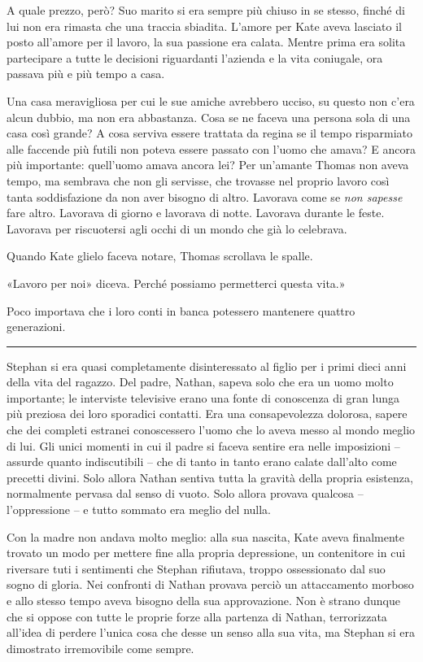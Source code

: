 \documentclass[a4paper,oneside,11pt]{memoir}
\begin{document}
A quale prezzo, però? Suo marito si era sempre più chiuso in se stesso, finché
di lui non era rimasta che una traccia sbiadita. L'amore per Kate aveva lasciato
il posto all'amore per il lavoro, la sua passione era calata. Mentre prima era
solita partecipare a tutte le decisioni riguardanti l'azienda e la vita
coniugale, ora passava più e più tempo a casa.

Una casa meravigliosa per cui le sue amiche avrebbero ucciso, su questo non
c'era alcun dubbio, ma non era abbastanza. Cosa se ne faceva una persona sola di
una casa così grande? A cosa serviva essere trattata da regina se il tempo
risparmiato alle faccende più futili non poteva essere passato con l'uomo che
amava? E ancora più importante: quell'uomo amava ancora lei? Per un'amante
Thomas non aveva tempo, ma sembrava che non gli servisse, che trovasse nel
proprio lavoro così tanta soddisfazione da non aver bisogno di altro. Lavorava
come se \emph{non sapesse} fare altro. Lavorava di giorno e lavorava di notte.
Lavorava durante le feste. Lavorava per riscuotersi agli occhi di un mondo che
già lo celebrava.

Quando Kate glielo faceva notare, Thomas scrollava le spalle.

«Lavoro per noi» diceva. Perché possiamo permetterci questa vita.»

Poco importava che i loro conti in banca potessero mantenere quattro
generazioni.

\plainbreak{1}

Stephan si era quasi completamente disinteressato al figlio per i primi dieci
anni della vita del ragazzo. Del padre, Nathan, sapeva solo che era un uomo
molto importante; le interviste televisive erano una fonte di conoscenza di gran
lunga più preziosa dei loro sporadici contatti. Era una consapevolezza dolorosa,
sapere che dei completi estranei conoscessero l'uomo che lo aveva messo al mondo
meglio di lui. Gli unici momenti in cui il padre si faceva sentire era nelle
imposizioni -- assurde quanto indiscutibili -- che di tanto in tanto erano
calate dall'alto come precetti divini. Solo allora Nathan sentiva tutta la
gravità della propria esistenza, normalmente pervasa dal senso di vuoto. Solo
allora provava qualcosa -- l'oppressione -- e tutto sommato era meglio del
nulla.

Con la madre non andava molto meglio: alla sua nascita, Kate aveva finalmente
trovato un modo per mettere fine alla propria depressione, un contenitore in cui
riversare tuti i sentimenti che Stephan rifiutava, troppo ossessionato dal suo
sogno di gloria. Nei confronti di Nathan provava perciò un attaccamento morboso
e allo stesso tempo aveva bisogno della sua approvazione. Non è strano dunque
che si oppose con tutte le proprie forze alla partenza di Nathan, terrorizzata
all'idea di perdere l'unica cosa che desse un senso alla sua vita, ma Stephan si
era dimostrato irremovibile come sempre.
\end{document}
